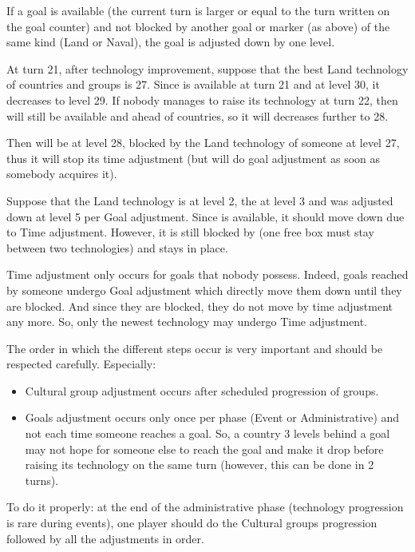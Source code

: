  If a goal is available (the current turn is larger or
equal to the turn written on the goal counter) and not blocked by another goal
or marker (as above) of the same kind (Land or Naval), the goal is adjusted
down by one level.

\begin{exemple}
  At turn 21, after technology improvement, suppose that the best Land
  technology of countries and groups is 27. Since \TMUS is available at turn
  21 and at level 30, it decreases to level 29. If nobody manages to raise its
  technology at turn 22, then \TMUS will still be available and ahead of
  countries, so it will decreases further to 28.

  Then \TMUS will be at level 28, blocked by the Land technology of someone at
  level 27, thus it will stop its time adjustment (but will do goal adjustment
  as soon as somebody acquires it).
\end{exemple}

\begin{exemple}
  Suppose that the \ROTW Land technology is at level 2, the \TREN at level 3
  and \TARQ was adjusted down at level 5 per Goal adjustment. Since \TARQ is
  available, it should move down due to Time adjustment. However, it is still
  blocked by \TREN (one free box must stay between two technologies) and stays
  in place.
\end{exemple}

\begin{playtip}
  Time adjustment only occurs for goals that nobody possess. Indeed, goals
  reached by someone undergo Goal adjustment which directly move them down
  until they are blocked. And since they are blocked, they do not move by time
  adjustment any more. So, only the newest technology may undergo Time
  adjustment.
\end{playtip}

\begin{designnote}
  The order in which the different steps occur is very important and should be
  respected carefully. Especially:
  \begin{itemize}
  \item Cultural group adjustment occurs after scheduled progression of
    groups.
  \item Goals adjustment occurs only once per phase (Event or Administrative)
    and not each time someone reaches a goal. So, a country 3 levels behind a
    goal may not hope for someone else to reach the goal and make it drop
    before raising its technology on the same turn (however, this can be done
    in 2 turns).
  \end{itemize}

  To do it properly: at the end of the administrative phase (technology
  progression is rare during events), one player should do the Cultural groups
  progression followed by all the adjustments in order.
\end{designnote}


